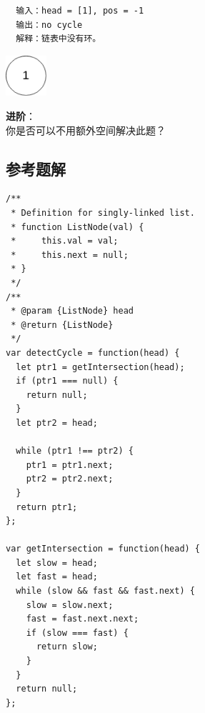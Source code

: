 \begin{verbatim}
  输入：head = [1], pos = -1
  输出：no cycle
  解释：链表中没有环。
\end{verbatim}

\includegraphics[width=15mm,height=15mm]{images/leetcode/circularlinkedlist_test3.png}

\textbf{进阶}：\\
你是否可以不用额外空间解决此题？

\subsection{参考题解}

\begin{verbatim}
/**
 * Definition for singly-linked list.
 * function ListNode(val) {
 *     this.val = val;
 *     this.next = null;
 * }
 */
/**
 * @param {ListNode} head
 * @return {ListNode}
 */
var detectCycle = function(head) {
  let ptr1 = getIntersection(head);
  if (ptr1 === null) {
    return null;
  }
  let ptr2 = head;

  while (ptr1 !== ptr2) {
    ptr1 = ptr1.next;
    ptr2 = ptr2.next;
  }
  return ptr1;
};

var getIntersection = function(head) {
  let slow = head;
  let fast = head;
  while (slow && fast && fast.next) {
    slow = slow.next;
    fast = fast.next.next;
    if (slow === fast) {
      return slow;
    }
  }
  return null;
};
\end{verbatim}
